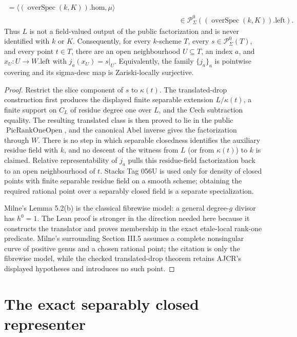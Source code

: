 \begin{theorem}
\[\begin{aligned}
        =\langle(\operatorname{overSpec}(k,K)).\mathrm{hom},\mu\rangle\\
      &\hspace{8em}\in
        \mathcal P^0_\Sigma((\operatorname{overSpec}(k,K)).\mathrm{left}).
    \end{aligned}
  \]
  Thus \(L\) is not a field-valued output of the public factorization and is
  never identified with \(k\) or \(K\).  Consequently, for every \(k\)-scheme
  \(T\), every \(s\in\mathcal P^0_\Sigma(T)\), and every point \(t\in T\), there are
  an open neighbourhood \(U\subseteq T\), an index \(a\), and
  \(x_U:U\to W.\mathrm{left}\) with \(j_a(x_U)=s|_U\).  Equivalently, the family
  \(\{j_a\}_a\) is pointwise covering and its sigma-desc map is
  Zariski-locally surjective.
\end{theorem}

\begin{proof}
  Restrict the slice component of \(s\) to \(\kappa(t)\).  The translated-drop construction first
  produces the displayed finite separable extension \(L/\kappa(t)\), a finite
  support on \(C_L\) of residue degree one over \(L\), and the Cech
  subtraction equality.  The resulting translated class is then proved to
  lie in the public \(\operatorname{PicRankOneOpen}\), and the canonical Abel
  inverse gives the factorization through \(W\).  There is no step in which
  separable closedness identifies the auxiliary residue field with \(k\), and
  no descent of the witness from \(L\) (or from \(\kappa(t)\)) to \(k\) is
  claimed.  Relative representability of \(j_a\) pulls this residue-field factorization
  back to an open neighbourhood of \(t\).  Stacks Tag 056U is used only for
  density of closed points with finite separable residue field on a smooth
  scheme; obtaining the required rational point over a separably closed field
  is a separate specialization.

  Milne's Lemma 5.2(b) is the classical fibrewise model: a general
  degree-\(g\) divisor has \(h^0=1\).  The Lean proof is stronger in the
  direction needed here because it constructs the translator and proves
  membership in the exact etale-local rank-one predicate.  Milne's surrounding
  Section III.5 assumes a complete nonsingular curve of positive genus and a
  chosen rational point; the citation is only the fibrewise model, while the
  checked translated-drop theorem retains AJCR's displayed hypotheses and
  introduces no such point.
\end{proof}

\section{The exact separably closed representer}

